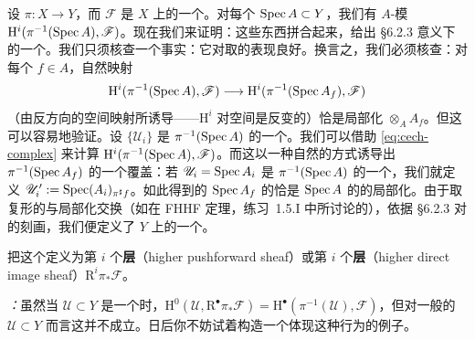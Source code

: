 设 $\pi\colon X\to Y$，而 $\mathscr{F}$ 是 $X$ 上的一个\trQCSheaf。对每个 $\operatorname{Spec} A\subset Y$，我们有 $A$-模 $\mathrm{H}^i(\pi^{-1}(\operatorname{Spec} A),\mathscr{F})$。现在我们来证明：这些东西拼合起来，给出 \S6.2.3 意义下的一个\trQCSheaf。我们只须核查一个事实：它对取\trDistinguishedOpen{}的表现良好。换言之，我们必须核查：对每个 $f\in A$，自然映射
\[
\mathrm{H}^i(\pi^{-1}(\operatorname{Spec} A),\mathscr{F})\longrightarrow\mathrm{H}^i(\pi^{-1}(\operatorname{Spec} A_f),\mathscr{F})
\]
（由反方向的空间映射所诱导——$\mathrm{H}^i$ 对空间是反变的）恰是局部化 $\otimes_A A_f$。但这可以容易地验证。设 $\{\mathscr{U}_i\}$ 是 $\pi^{-1}(\operatorname{Spec} A)$ 的一个\trAffine\trCover。我们可以借助\trCech\trComplexN{} \eqref{eq:cech-complex} 来计算 $\mathrm{H}^i(\pi^{-1}(\operatorname{Spec} A),\mathscr{F})$。而这以一种自然的方式诱导出 $\pi^{-1}(\operatorname{Spec} A_f)$ 的一个覆盖：若 $\mathscr{U}_i=\operatorname{Spec} A_i$ 是 $\pi^{-1}(\operatorname{Spec} A)$ 的一个\trAffine\trOpenSubset，我们就定义 $\mathscr{U}'_i:=\operatorname{Spec}(A_i)_{\pi^\sharp f}$。如此得到的 $\operatorname{Spec} A_f$ 的\trCech\trComplexN{}恰是 $\operatorname{Spec} A$ 的\trCech\trComplexN{}的局部化。由于取复形的\trCohomology{}与局部化交换（如在 FHHF 定理，\mbox{练习~1.5.I} 中所讨论的），依据 \S6.2.3 对\trQCSheaf{}的刻画，我们便定义了 $Y$ 上的一个\trQCSheaf。

把这个\trQCSheaf{}定义为第 $i$ 个\textbf{\trHigherPushforward{}层}（higher pushforward sheaf）或第 $i$ 个\textbf{\trHigherDirectImage{}层}（higher direct image sheaf）$\mathrm{R}^i\pi_*\mathscr{F}$。

\emph{\trhCaveat：}虽然当 $\mathscr{U}\subset Y$ 是一个\trAffine\trOpenSubset{}时，$\mathrm{H}^0(\mathscr{U},\mathrm{R}^\bullet\pi_*\mathscr{F})=\mathrm{H}^\bullet(\pi^{-1}(\mathscr{U}),\mathscr{F})$，但对一般的\trOpenSubset{} $\mathscr{U}\subset Y$ 而言这并不成立。日后你不妨试着构造一个体现这种行为的例子。

